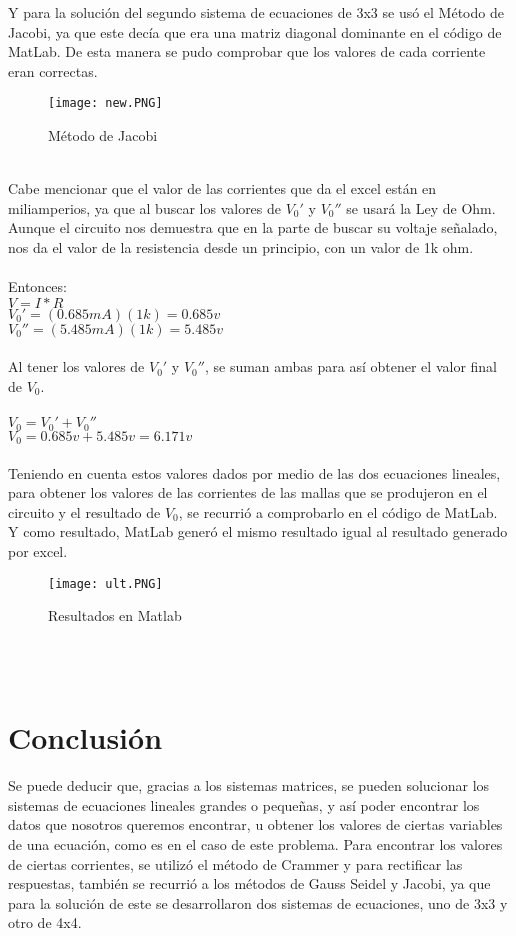 \documentclass[12pt]{article}
\begin{document}
Y para la solución del segundo sistema de ecuaciones de 3x3 se usó el Método de Jacobi, ya que este decía que era una matriz diagonal dominante en el código de MatLab. De esta manera se pudo comprobar que los valores de cada corriente eran correctas.
\begin{figure}[hbtp]
\caption{Método de Jacobi}
\centering
\texttt{[image: new.PNG]}
\end{figure}
\\
Cabe mencionar que el valor de las corrientes que da el excel están en miliamperios, ya que al buscar los valores de $V_0'$ y $V_0''$ se usará la Ley de Ohm.
Aunque el circuito nos demuestra que en la parte de buscar su voltaje señalado, nos da el valor de la resistencia desde un principio, con un valor de 1k ohm.
\\ \\
Entonces: \\
$V=I*R$\\
$V_0'=(0.685mA)(1k)=0.685v$\\
$V_0''=(5.485mA)(1k)=5.485v$
\\ \\
Al tener los valores de $V_0'$ y $V_0''$, se suman ambas para así obtener el valor final de $V_0$.\\ \\
$V_0 = V_0' + V_0''$\\
$V_0 = 0.685v + 5.485v = 6.171v$
\\ \\
Teniendo en cuenta estos valores dados por medio de las dos ecuaciones lineales, para obtener los valores de las corrientes de las mallas que se produjeron en el circuito y el resultado de $V_0$, se recurrió a comprobarlo en el código de MatLab.
Y como resultado, MatLab generó el mismo resultado igual al resultado generado por excel.
\begin{figure}[hbtp]
\caption{Resultados en Matlab}
\centering
\texttt{[image: ult.PNG]}
\end{figure}
\\ \\

\section{Conclusión}\label{conclusions}
Se puede deducir que, gracias a los sistemas matrices, se pueden solucionar los sistemas de ecuaciones lineales grandes o pequeñas, y así poder encontrar los datos que nosotros queremos encontrar, u obtener los valores de ciertas variables de una ecuación, como es en el caso de este problema. Para encontrar los valores de ciertas corrientes, se utilizó el método de Crammer y para rectificar las respuestas, también se recurrió a los métodos de Gauss Seidel y Jacobi, ya que para la solución de este se desarrollaron dos sistemas de ecuaciones, uno de 3x3 y otro de 4x4.
\end{document}
